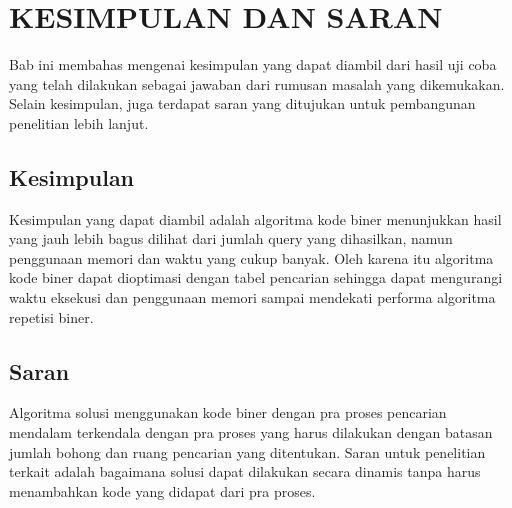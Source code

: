 \chapter{KESIMPULAN DAN SARAN}

Bab ini membahas mengenai kesimpulan yang dapat diambil dari hasil uji coba yang telah dilakukan sebagai jawaban dari rumusan masalah yang dikemukakan. Selain kesimpulan, juga terdapat saran yang ditujukan untuk pembangunan penelitian lebih lanjut.

\section{Kesimpulan}

Kesimpulan yang dapat diambil adalah algoritma kode biner menunjukkan hasil yang jauh lebih bagus dilihat dari jumlah query yang dihasilkan, namun penggunaan memori dan waktu yang cukup banyak. Oleh karena itu algoritma kode biner dapat dioptimasi dengan tabel pencarian sehingga dapat mengurangi waktu eksekusi dan penggunaan memori sampai mendekati performa algoritma repetisi biner.

\section{Saran}

Algoritma solusi menggunakan kode biner dengan pra proses pencarian mendalam terkendala dengan pra proses yang harus dilakukan dengan batasan jumlah bohong dan ruang pencarian yang ditentukan. Saran untuk penelitian terkait adalah bagaimana solusi dapat dilakukan secara dinamis tanpa harus menambahkan kode yang didapat dari pra proses.
